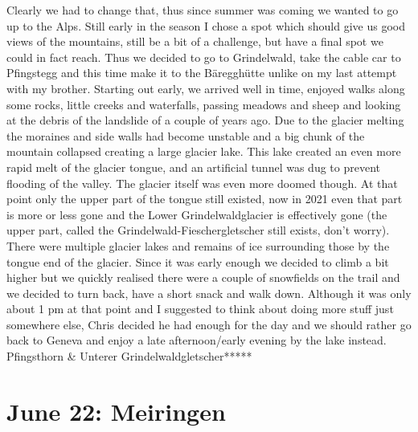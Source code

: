 Clearly we had to change that, thus since summer was coming we wanted to go up to the Alps. Still early in the season I chose a spot which should give us good views of the mountains, still be a bit of a challenge, but have a final spot we could in fact reach. Thus we decided to go to Grindelwald, take the cable car to Pfingstegg and this time make it to the B\"areggh\"utte unlike on my last attempt with my brother. Starting out early, we arrived well in time, enjoyed walks along some rocks, little creeks and waterfalls, passing meadows and sheep and looking at the debris of the landslide of a couple of years ago. Due to the glacier melting the moraines and side walls had become unstable and a big chunk of the mountain collapsed creating a large glacier lake. This lake created an even more rapid melt of the glacier tongue, and an artificial tunnel was dug to prevent flooding of the valley. The glacier itself was even more doomed though. At that point only the upper part of the tongue still existed, now in 2021 even that part is more or less gone and the Lower Grindelwaldglacier is effectively gone (the upper part, called the Grindelwald-Fieschergletscher still exists, don't worry). There were multiple glacier lakes and remains of ice surrounding those by the tongue end of the glacier. Since it was early enough we decided to climb a bit higher but we quickly realised there were a couple of snowfields on the trail and we decided to turn back, have a short snack and walk down. Although it was only about 1 pm at that point and I suggested to think about doing more stuff just somewhere else, Chris decided he had enough for the day and we should rather go back to Geneva and enjoy a late afternoon/early evening by the lake instead.\\

Pfingsthorn \& Unterer Grindelwaldgletscher*****

\section{June 22: Meiringen}
\label{Meiringen2014}

